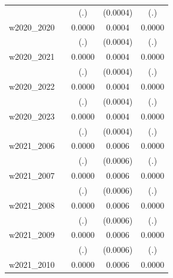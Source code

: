 \begin{table}[htbp]
\begin{tabular}{l*{4}{c}}
            &                     &         (.)         &    (0.0004)         &         (.)         \\
[1em]
w2020\_2020  &                     &      0.0000         &      0.0004         &      0.0000         \\
            &                     &         (.)         &    (0.0004)         &         (.)         \\
[1em]
w2020\_2021  &                     &      0.0000         &      0.0004         &      0.0000         \\
            &                     &         (.)         &    (0.0004)         &         (.)         \\
[1em]
w2020\_2022  &                     &      0.0000         &      0.0004         &      0.0000         \\
            &                     &         (.)         &    (0.0004)         &         (.)         \\
[1em]
w2020\_2023  &                     &      0.0000         &      0.0004         &      0.0000         \\
            &                     &         (.)         &    (0.0004)         &         (.)         \\
[1em]
w2021\_2006  &                     &      0.0000         &      0.0006         &      0.0000         \\
            &                     &         (.)         &    (0.0006)         &         (.)         \\
[1em]
w2021\_2007  &                     &      0.0000         &      0.0006         &      0.0000         \\
            &                     &         (.)         &    (0.0006)         &         (.)         \\
[1em]
w2021\_2008  &                     &      0.0000         &      0.0006         &      0.0000         \\
            &                     &         (.)         &    (0.0006)         &         (.)         \\
[1em]
w2021\_2009  &                     &      0.0000         &      0.0006         &      0.0000         \\
            &                     &         (.)         &    (0.0006)         &         (.)         \\
[1em]
w2021\_2010  &                     &      0.0000         &      0.0006         &      0.0000         \\

\end{tabular}
\end{table}
